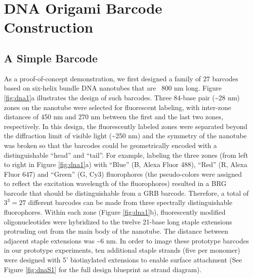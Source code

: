 \section{DNA Origami Barcode Construction}
\subsection{A Simple Barcode}
As a proof-of-concept demonstration, we first designed a family of 27 barcodes 
based on six-helix bundle DNA nanotubes \citep{douglas_dna-nanotube-induced_2007} that are ~800 nm long. Figure \ref{fig:dna1}a illustrates 
the design of such barcodes. Three 84-base pair (\textasciitilde28 nm) zones on the nanotube were 
selected for fluorescent labeling, with inter-zone distances of 450 nm and 270 nm 
between the first and the last two zones, respectively. In this design, the fluorescently 
labeled zones were separated beyond the diffraction limit of visible light (\textasciitilde250 nm) and 
the symmetry of the nanotube was broken so that the barcodes could be geometrically 
encoded with a distinguishable “head” and “tail”. For example, labeling the three zones 
(from left to right in Figure \ref{fig:dna1}a) with “Blue” (B, Alexa Fluor 488), “Red” (R, Alexa Fluor 
647) and “Green” (G, Cy3) fluorophores (the pseudo-colors were assigned to reflect the 
excitation wavelength of the fluorophores) resulted in a BRG barcode that should be 
distinguishable from a GRB barcode. Therefore, a total of $3^{3}=27$ different barcodes can 
be made from three spectrally distinguishable fluorophores. Within each zone (Figure 
\ref{fig:dna1}b), fluorescently modified oligonucleotides were hybridized to the twelve 21-base long 
staple extensions protruding out from the main body of the nanotube. The distance 
between adjacent staple extensions was \textasciitilde6 nm. In order to image these prototype 
barcodes in our prototype experiments, ten additional staple strands (five per monomer) 
were designed with 5' biotinylated extensions to enable surface attachment (See Figure 
\ref{fig:dnaS1} for the full design blueprint as strand diagram). 


